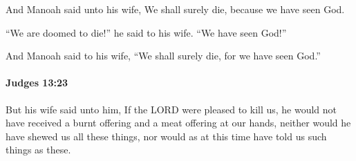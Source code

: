 			\begin{versebox}
					\item[BHS] 
					\item[ASV] And Manoah said unto his wife, We shall surely die, because we have seen God.
					\item[NIV] “We are doomed to die!” he said to his wife. “We have seen God!”
					\item[NRSV] And Manoah said to his wife, “We shall surely die, for we have seen God.”
			\end{versebox}

		\paragraph{Judges 13:23} %
			\label{JUDGES-13-23}

			But his wife said unto him, If the LORD were pleased to kill us, he would not have received a burnt offering and a meat offering at our hands, neither would he have shewed us all these things, nor would as at this time have told us such things as these.


